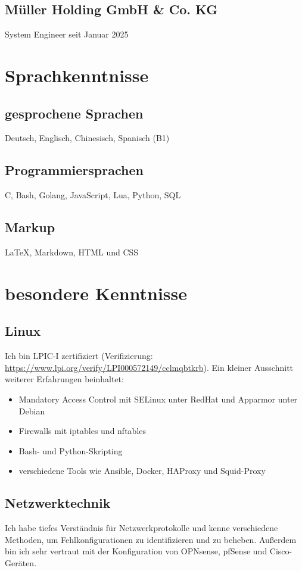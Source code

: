 \documentclass{article}
\begin{document}
\subsection{Müller Holding GmbH \& Co. KG}
System Engineer seit Januar 2025

\section{Sprachkenntnisse}

\subsection{gesprochene Sprachen}
Deutsch, Englisch, Chinesisch, Spanisch (B1)

\subsection{Programmiersprachen}
C, Bash, Golang, JavaScript, Lua, Python, SQL

\subsection{Markup}
\LaTeX, Markdown, HTML und CSS

\section{besondere Kenntnisse}

\subsection{Linux}
Ich bin LPIC-I zertifiziert (Verifizierung: \href{https://www.lpi.org/verify/LPI000572149/cclmqbtkrb}{https://www.lpi.org/verify/LPI000572149/cclmqbtkrb}).
Ein kleiner Ausschnitt weiterer Erfahrungen beinhaltet:
\begin{itemize}
\item{Mandatory Access Control mit SELinux unter RedHat und Apparmor unter Debian}
\item{Firewalls mit iptables und nftables}
\item{Bash- und Python-Skripting}
\item{verschiedene Tools wie Ansible, Docker, HAProxy und Squid-Proxy}
\end{itemize}

\subsection{Netzwerktechnik}
Ich habe tiefes Verständnis für Netzwerkprotokolle und kenne verschiedene Methoden, um Fehlkonfigurationen zu identifizieren und zu beheben.
Außerdem bin ich sehr vertraut mit der Konfiguration von OPNsense, pfSense und Cisco-Geräten.
\end{document}
